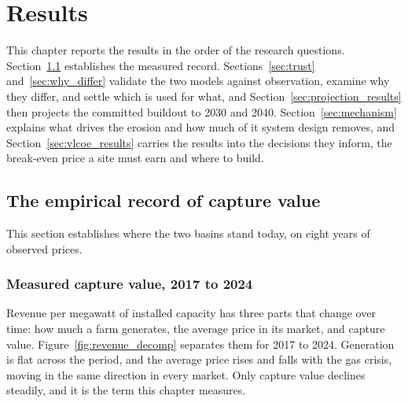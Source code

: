 
\section{Results}\label{sec:results}

This chapter reports the results in the order of the research questions.
Section~\ref{sec:measured} establishes the measured record.
Sections~\ref{sec:trust} and~\ref{sec:why_differ} validate the two models
against observation, examine why they differ, and settle which is used for
what, and Section~\ref{sec:projection_results} then projects the committed
buildout to 2030 and 2040. Section~\ref{sec:mechanism} explains what drives
the erosion and how much of it system design removes, and
Section~\ref{sec:vlcoe_results} carries the results into the decisions they
inform, the break-even price a site must earn and where to build. 




\subsection{The empirical record of capture value}\label{sec:measured}

This section establishes where the two basins stand today, on eight years of
observed prices.

\subsubsection{Measured capture value, 2017 to 2024}
\label{sec:eight_years}

Revenue per megawatt of installed capacity has three parts that change over
time: how much a farm generates, the average price in its market, and capture
value. Figure~\ref{fig:revenue_decomp} separates them for 2017 to 2024.
Generation is flat across the period, and the average price rises and falls
with the gas crisis, moving in the same direction in every market. Only capture value
declines steadily, and it is the term this chapter measures.

